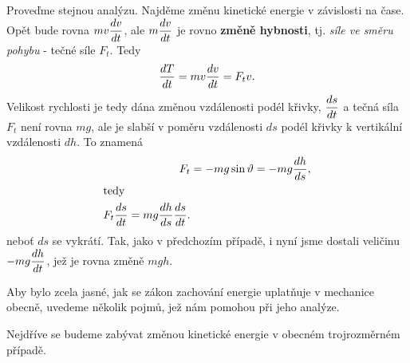 {    Proveďme stejnou analýzu. Najděme změnu kinetické energie v závislosti na čase. Opět bude    
    rovna \(mv\dfrac{d v}{d t}\), ale \(m\dfrac{d v}{d t}\) je rovno \textbf{změně hybnosti}, tj. \emph{síle ve 
    směru pohybu} - tečné síle \(F_t\). Tedy
    \begin{equation}\label{FYZ:eq028}
      \dfrac{d T}{d t} = mv\dfrac{d v}{d t} = F_tv.
    \end{equation}
    Velikost rychlosti je tedy dána změnou vzdálenosti podél křivky, \(\dfrac{d s}{d t}\) a tečná síla 
    \(F_t\) není rovna \(mg\), ale je slabší v poměru vzdálenosti \(ds\) podél křivky k vertikální 
    vzdálenosti \(dh\). To znamená
    \begin{align}
      F_t &= -mg\sin\vartheta = -mg\dfrac{d h}{d s},  \nonumber \\
      \shortintertext{tedy}
      F_t\dfrac{d s}{d t} = mg\dfrac{d h}{d s}\dfrac{d s}{d t}.   \label{FYZ:eq029}
    \end{align}
    neboť \(ds\) se vykrátí. Tak, jako v předchozím případě, i nyní jsme dostali veličinu \(- 
    mg\dfrac{d h}{d t}\), jež je rovna změně \(mgh\).
    
    Aby bylo zcela jasné, jak se zákon zachování energie uplatňuje v mechanice obecně, uvedeme    
    několik pojmů, jež nám pomohou při jeho analýze.
    
    Nejdříve se budeme zabývat změnou kinetické energie v obecném trojrozměrném případě.
    
}
